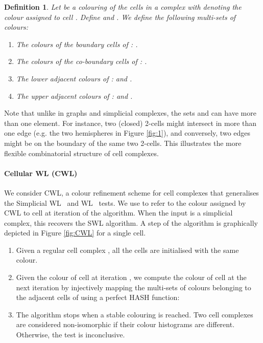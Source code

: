 \documentclass{article}
\newtheorem{definition}[theorem]{Definition}
\begin{document}
\begin{definition}
Let  be a colouring of the cells in a complex  with  denoting the colour assigned to cell . Define  and . We define the following multi-sets of colours:
\begin{enumerate}[leftmargin=*, topsep=0pt,itemsep=-0.5ex]
    \item The colours of the boundary cells of : . 
    \item The colours of the co-boundary cells of : .
    \item The lower adjacent colours of :  and .
    \item The upper adjacent colours of :  and .
\end{enumerate}
\end{definition}

Note that unlike in graphs and simplicial complexes, the sets  and  can have more than one element. For instance, two (closed) 2-cells might intersect in more than one edge (e.g. the two hemispheres in Figure \ref{fig:1}), and conversely, two edges might be on the boundary of the same two 2-cells. This illustrates the more flexible combinatorial structure of cell complexes. 

\paragraph{Cellular WL (CWL)} We consider CWL, a colour refinement scheme for cell complexes that generalises the Simplicial WL~\citep{bodnar2021weisfeiler} and WL~\citep{weisfeiler1968reduction} tests. We use  to refer to the colour assigned by CWL to cell  at iteration  of the algorithm. When the input is a simplicial complex, this recovers the SWL algorithm. A step of the algorithm is graphically depicted in Figure \ref{fig:CWL} for a single cell. 
\begin{enumerate}[leftmargin=*]
    \item Given a regular cell complex , all the cells  are initialised with the same colour. 
    \item Given the colour  of cell  at iteration , we compute the colour of cell  at the next iteration   by injectively mapping the multi-sets of colours belonging to the adjacent cells of  using a perfect HASH function:  
    \item The algorithm stops when a stable colouring is reached. Two cell complexes are considered non-isomorphic if their colour histograms are different. Otherwise, the test is inconclusive. 
\end{enumerate}
\end{document}
